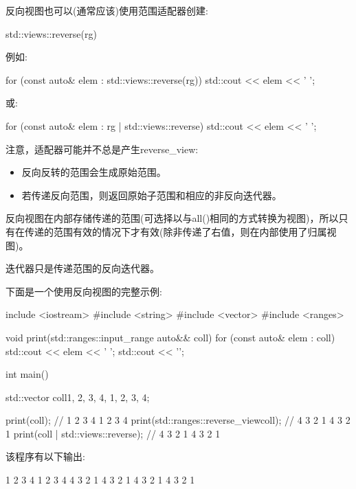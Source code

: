 
反向视图也可以(通常应该)使用范围适配器创建:

\begin{cpp}
std::views::reverse(rg)
\end{cpp}

例如:

\begin{cpp}
for (const auto& elem : std::views::reverse(rg)) {
	std::cout << elem << ' ';
}
\end{cpp}

或:

\begin{cpp}
for (const auto& elem : rg | std::views::reverse) {
	std::cout << elem << ' ';
}
\end{cpp}

注意，适配器可能并不总是产生reverse\_view:

\begin{itemize}
\item
反向反转的范围会生成原始范围。

\item
若传递反向范围，则返回原始子范围和相应的非反向迭代器。
\end{itemize}

反向视图在内部存储传递的范围(可选择以与all()相同的方式转换为视图)，所以只有在传递的范围有效的情况下才有效(除非传递了右值，则在内部使用了归属视图)。

迭代器只是传递范围的反向迭代器。

下面是一个使用反向视图的完整示例:


\begin{cpp}
include <iostream>
#include <string>
#include <vector>
#include <ranges>

void print(std::ranges::input_range auto&& coll)
{
	for (const auto& elem : coll) {
		std::cout << elem << ' ';
	}
	std::cout << '\n';
}

int main()
{
	std::vector coll{1, 2, 3, 4, 1, 2, 3, 4};
	
	print(coll); // 1 2 3 4 1 2 3 4
	print(std::ranges::reverse_view{coll}); // 4 3 2 1 4 3 2 1
	print(coll | std::views::reverse); // 4 3 2 1 4 3 2 1
}
\end{cpp}

该程序有以下输出:

\begin{shell}
1 2 3 4 1 2 3 4
4 3 2 1 4 3 2 1
4 3 2 1 4 3 2 1
\end{shell}

